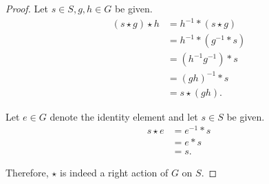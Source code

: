 \documentclass[12pt, psamsfonts]{amsart}
\theoremstyle{definition}
\theoremstyle{remark}
\numberwithin{equation}{section}
\begin{document}
\begin{proof}
  Let $s \in S, g, h \in G$ be given.
  \begin{align*}
    (s \star g) \star h
      &= h^{-1} * (s \star g) \\
      &= h^{-1} * (g^{-1} * s) \\
      &= (h^{-1}g^{-1}) * s \\
      &= (gh)^{-1} * s \\
      &= s \star (gh).
  \end{align*}

  Let $e \in G$ denote the identity element and let $s \in S$ be given.
  \begin{align*}
    s \star e
      &= e^{-1} * s \\
      &= e * s \\
      &= s.
  \end{align*}

  Therefore, $\star$ is indeed a right action of $G$ on $S$.
\end{proof}
\end{document}
